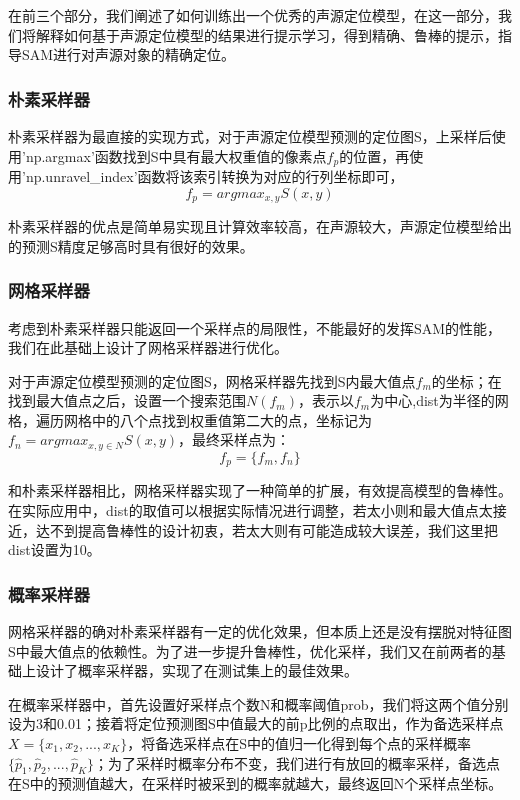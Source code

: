 \documentclass[12pt]{article}
\begin{document}
在前三个部分，我们阐述了如何训练出一个优秀的声源定位模型，在这一部分，我们将解释如何基于声源定位模型的结果进行提示学习，得到精确、鲁棒的提示，指导SAM进行对声源对象的精确定位。
\subsubsection{朴素采样器}
朴素采样器为最直接的实现方式，对于声源定位模型预测的定位图S，上采样后使用'np.argmax'函数找到S中具有最大权重值的像素点$f_p$的位置，再使用'np.unravel\_index'函数将该索引转换为对应的行列坐标即可，
$$f_p=argmax_{x,y}S(x,y)$$

朴素采样器的优点是简单易实现且计算效率较高，在声源较大，声源定位模型给出的预测S精度足够高时具有很好的效果。

\subsubsection{网格采样器}
考虑到朴素采样器只能返回一个采样点的局限性，不能最好的发挥SAM的性能，我们在此基础上设计了网格采样器进行优化。

对于声源定位模型预测的定位图S，网格采样器先找到S内最大值点$f_m$的坐标；在找到最大值点之后，设置一个搜索范围$N(f_m)$，表示以$f_m$为中心,dist为半径的网格，遍历网格中的八个点找到权重值第二大的点，坐标记为$f_n=argmax_{x,y\in N}S(x,y)$，最终采样点为：
$${f_p} = \{f_m,f_n\}$$

和朴素采样器相比，网格采样器实现了一种简单的扩展，有效提高模型的鲁棒性。在实际应用中，dist的取值可以根据实际情况进行调整，若太小则和最大值点太接近，达不到提高鲁棒性的设计初衷，若太大则有可能造成较大误差，我们这里把dist设置为10。

\subsubsection{概率采样器}
网格采样器的确对朴素采样器有一定的优化效果，但本质上还是没有摆脱对特征图S中最大值点的依赖性。为了进一步提升鲁棒性，优化采样，我们又在前两者的基础上设计了概率采样器，实现了在测试集上的最佳效果。

在概率采样器中，首先设置好采样点个数N和概率阈值prob，我们将这两个值分别设为3和0.01；接着将定位预测图S中值最大的前p比例的点取出，作为备选采样点$X = \{x_1, x_2, ..., x_K\}$，将备选采样点在S中的值归一化得到每个点的采样概率$\{\hat{p}_1, \hat{p}_2, ... ,\hat{p}_K\}$；为了采样时概率分布不变，我们进行有放回的概率采样，备选点在S中的预测值越大，在采样时被采到的概率就越大，最终返回N个采样点坐标。
\end{document}
